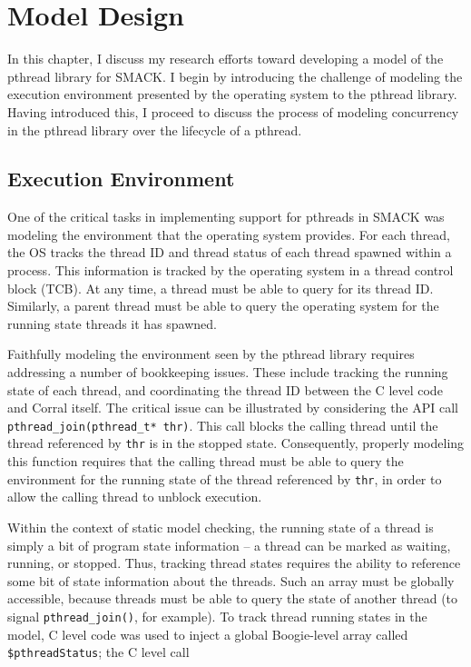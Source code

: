 \chapter{Model Design}\label{ch:modeldesign}
In this chapter, I discuss my research efforts toward developing a
model of the pthread library for SMACK.  I begin by introducing the
challenge of modeling the execution environment presented by the
operating system to the pthread library.  Having introduced this, I
proceed to discuss the process of modeling concurrency in the pthread
library over the lifecycle of a pthread.

\section{Execution Environment}\label{sec:executionenvironment}
One of the critical tasks in implementing support for pthreads in
SMACK was modeling the environment that the operating system provides.
For each thread, the OS tracks the thread ID and thread status of
each thread spawned within a process.  This information is tracked by
the operating system in a thread control block (TCB).  At any time, a
thread must be able to query for its thread ID.  Similarly, a 
parent thread must be able to query the operating system for the
running state threads it has spawned.

Faithfully modeling the environment seen by the pthread library
requires addressing a number of bookkeeping issues.  These include
tracking the running state of each thread, and coordinating the thread
ID between the C level code and Corral itself.  The critical issue can
be illustrated by considering the API call
\lstinline|pthread_join(pthread_t* thr)|. This call blocks the calling
thread until the thread referenced by \lstinline|thr| is in the stopped
state.  Consequently, properly modeling this function requires that the
calling thread must be able to query the environment for the running
state of the thread referenced by \lstinline|thr|, in order to allow
the calling thread to unblock execution.

Within the context of static model checking, the running state of a
thread is simply a bit of program state information -- a thread can be
marked as waiting, running, or stopped. Thus, tracking thread states
requires the ability to reference some bit of state information about
the threads. Such an array must be globally accessible, because threads
must be able to query the state of another thread (to signal
\lstinline|pthread_join()|, for example).  To track thread running
states in the model, C level code was used to inject a global
Boogie-level array called \lstinline|$pthreadStatus|; the C level call   

